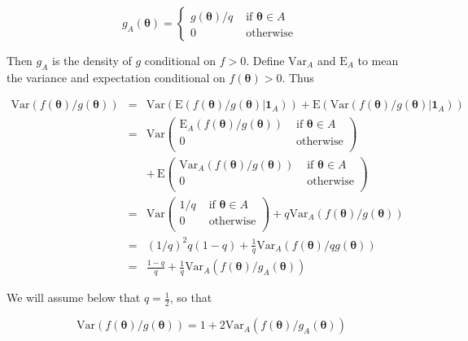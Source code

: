 \documentclass[letterpaper,12pt]{article}
\newcommand{\btheta}{\boldsymbol \theta}
\begin{document}
\begin{equation*}
  g_A(\btheta) = \left\{
  \begin{array}{cl}
    g(\btheta)/q & \mbox{ if } \btheta \in A\\
    0 & \mbox{ otherwise }
  \end{array} \right.
\end{equation*}

\noindent Then $g_A$ is the density of $g$ conditional on $f > 0$.
Define $\mbox{Var}_A$ and $\mbox{E}_A$ to mean the variance and
expectation conditional on $f(\btheta) > 0$.  Thus

\begin{eqnarray*}
  \mbox{Var}(f(\btheta)/g(\btheta)) &=& \mbox{Var}(\mbox{E}(f(\btheta)
  / g(\btheta) | \mathbf{1}_A)) + \mbox{E}(\mbox{Var}(f(\btheta) / g(\btheta) | \mathbf{1}_A))\\
  &=& \mbox{Var}\left(
  \begin{array}{cl}
    \mbox{E}_A(f(\btheta) / g(\btheta)) & \mbox{ if } \btheta \in A\\
    0 & \mbox{ otherwise}\\
  \end{array}\right)\\
  &&  + \,\mbox{E}\left(
  \begin{array}{cl}
    \mbox{Var}_A(f(\btheta) / g(\btheta)) & \mbox{ if } \btheta \in A\\
    0 & \mbox{ otherwise}\\
  \end{array}\right)\\
  &=& \mbox{Var}\left(
  \begin{array}{cl}
    1/q & \mbox{ if } \btheta \in A\\
    0 & \mbox{ otherwise}\\
  \end{array}\right) + q\mbox{Var}_A(f(\btheta) / g(\btheta))\\
  &=& (1/q)^2q(1-q) + \frac{1}{q}\mbox{Var}_A(f(\btheta) / q g(\btheta))\\
  &=& \frac{1-q}{q} + \frac{1}{q}\mbox{Var}_A(f(\btheta) / g_A(\btheta))
\end{eqnarray*}

We will assume below that $q=\frac{1}{2}$, so that

\begin{equation}
  \label{I var}
  \mbox{Var}(f(\btheta)/g(\btheta)) = 1 + 2 \mbox{Var}_A(f(\btheta) /
  g_A(\btheta))
\end{equation}
\end{document}
